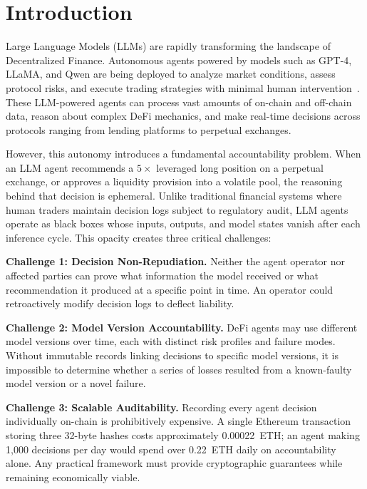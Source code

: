 \documentclass[manuscript,nonacm]{acmart}
\begin{document}

\maketitle


\section{Introduction}
\label{sec:intro}

Large Language Models (LLMs) are rapidly transforming the landscape of Decentralized Finance.
Autonomous agents powered by models such as GPT-4, LLaMA, and Qwen are being deployed to analyze market conditions, assess protocol risks, and execute trading strategies with minimal human intervention~\cite{autonomous_agents_blockchain}.
These LLM-powered agents can process vast amounts of on-chain and off-chain data, reason about complex DeFi mechanics, and make real-time decisions across protocols ranging from lending platforms to perpetual exchanges.

However, this autonomy introduces a fundamental accountability problem.
When an LLM agent recommends a $5\times$ leveraged long position on a perpetual exchange, or approves a liquidity provision into a volatile pool, the reasoning behind that decision is ephemeral.
Unlike traditional financial systems where human traders maintain decision logs subject to regulatory audit, LLM agents operate as black boxes whose inputs, outputs, and model states vanish after each inference cycle.
This opacity creates three critical challenges:

\textbf{Challenge 1: Decision Non-Repudiation.}
Neither the agent operator nor affected parties can prove what information the model received or what recommendation it produced at a specific point in time.
An operator could retroactively modify decision logs to deflect liability.

\textbf{Challenge 2: Model Version Accountability.}
DeFi agents may use different model versions over time, each with distinct risk profiles and failure modes.
Without immutable records linking decisions to specific model versions, it is impossible to determine whether a series of losses resulted from a known-faulty model version or a novel failure.

\textbf{Challenge 3: Scalable Auditability.}
Recording every agent decision individually on-chain is prohibitively expensive.
A single Ethereum transaction storing three 32-byte hashes costs approximately 0.00022~ETH; an agent making 1,000 decisions per day would spend over 0.22~ETH daily on accountability alone.
Any practical framework must provide cryptographic guarantees while remaining economically viable.
\end{document}
